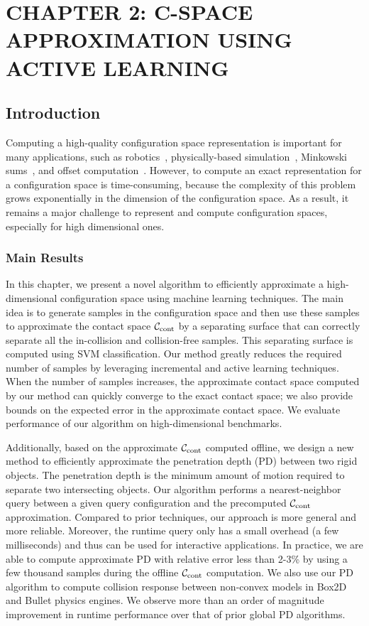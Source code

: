 \chapter[C-SPACE APPROXIMATION USING ACTIVE LEARNING]
{CHAPTER 2: C-SPACE APPROXIMATION USING ACTIVE LEARNING}
\label{chp:APD}

\section{Introduction}
\label{sec:2:intro}
Computing a high-quality configuration space representation is important for many applications, such as robotics~\cite{LPT:SpatialPlanning:1983}, physically-based simulation~\cite{Je:2012:PRP}, Minkowski sums~\cite{Varadhan:2006:TPA}, and offset computation~\cite{Choi:1997:CAD}. 
However, to compute an exact representation for a configuration space is time-consuming, because the complexity of this problem grows exponentially in the dimension of the configuration space. As a result, it remains a major challenge to represent and compute configuration spaces, especially for high dimensional ones.

\subsection{Main Results}
In this chapter, we present a novel algorithm to efficiently approximate a high-dimensional configuration space using machine learning techniques. The main idea is to generate samples in the configuration space and then use these samples to approximate the contact space $\mathcal C_\text{cont}$ by a separating surface that can correctly separate all the in-collision and collision-free samples. This separating surface is computed using SVM classification. Our method greatly reduces the required number of samples by leveraging incremental and active learning techniques. 
When the number of samples increases, the approximate contact space computed by our method can quickly converge to the exact contact space; we also provide bounds on the expected error in the approximate contact space. We evaluate performance of our algorithm on high-dimensional benchmarks.

Additionally, based on the approximate $\mathcal C_\text{cont}$ computed offline, we design a new method to efficiently approximate the penetration depth (PD) between two rigid objects. The penetration depth is the minimum amount of motion required to separate two intersecting objects. Our algorithm performs a nearest-neighbor query between a given query configuration and the precomputed $\mathcal C_\text{cont}$ approximation. Compared to prior techniques, our approach is more general and more reliable. Moreover, the runtime query only has a small overhead (a few milliseconds) and thus can be used for interactive applications. In practice, we are able to compute approximate PD with relative error less than 2-3\% by using a few thousand samples during the offline $\mathcal C_\text{cont}$ computation. We also use our PD algorithm to compute collision response between non-convex models in Box2D and Bullet physics engines. We observe more than an order of magnitude improvement in runtime performance over that of prior global PD algorithms.


